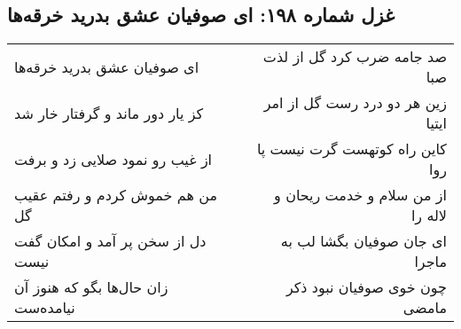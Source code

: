 \begin{center}
\section*{غزل شماره ۱۹۸: ای صوفیان عشق بدرید خرقه‌ها}
\label{sec:0198}
\begin{longtable}{l p{0.5cm} r}
ای صوفیان عشق بدرید خرقه‌ها
&&
صد جامه ضرب کرد گل از لذت صبا
\\
کز یار دور ماند و گرفتار خار شد
&&
زین هر دو درد رست گل از امر ایتیا
\\
از غیب رو نمود صلایی زد و برفت
&&
کاین راه کوتهست گرت نیست پا روا
\\
من هم خموش کردم و رفتم عقیب گل
&&
از من سلام و خدمت ریحان و لاله را
\\
دل از سخن پر آمد و امکان گفت نیست
&&
ای جان صوفیان بگشا لب به ماجرا
\\
زان حال‌ها بگو که هنوز آن نیامده‌ست
&&
چون خوی صوفیان نبود ذکر مامضی
\\
\end{longtable}
\end{center}
